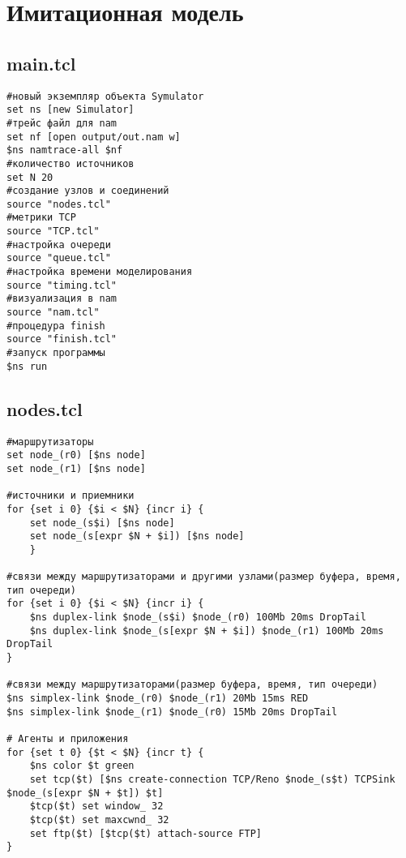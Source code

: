 
\chapter{Имитационная модель}
\label{app1}

\section*{main.tcl}
\label{app1:sec1}
\begin{verbatim}
#новый экземпляр объекта Symulator
set ns [new Simulator]
#трейс файл для nam
set nf [open output/out.nam w]
$ns namtrace-all $nf
#количество источников 
set N 20
#создание узлов и соединений
source "nodes.tcl"
#метрики TCP
source "TCP.tcl"
#настройка очереди		
source "queue.tcl"
#настройка времени моделирования  		
source "timing.tcl" 		
#визуализация в nam
source "nam.tcl"   		
#процедура finish
source "finish.tcl"                                                                         
#запуск программы
$ns run
\end{verbatim}

\section*{nodes.tcl}
\label{app1:sec2}
\begin{verbatim}
#маршрутизаторы
set node_(r0) [$ns node]  
set node_(r1) [$ns node]  

#источники и приемники
for {set i 0} {$i < $N} {incr i} {
	set node_(s$i) [$ns node] 		
	set node_(s[expr $N + $i]) [$ns node]	
	}

#связи между маршрутизаторами и другими узлами(размер буфера, время, тип очереди)
for {set i 0} {$i < $N} {incr i} {
	$ns duplex-link $node_(s$i) $node_(r0) 100Mb 20ms DropTail
	$ns duplex-link $node_(s[expr $N + $i]) $node_(r1) 100Mb 20ms DropTail
}

#связи между маршрутизаторами(размер буфера, время, тип очереди)
$ns simplex-link $node_(r0) $node_(r1) 20Mb 15ms RED
$ns simplex-link $node_(r1) $node_(r0) 15Mb 20ms DropTail

# Агенты и приложения
for {set t 0} {$t < $N} {incr t} {
	$ns color $t green
	set tcp($t) [$ns create-connection TCP/Reno $node_(s$t) TCPSink $node_(s[expr $N + $t]) $t]
	$tcp($t) set window_ 32
	$tcp($t) set maxcwnd_ 32
	set ftp($t) [$tcp($t) attach-source FTP]
}
\end{verbatim}

